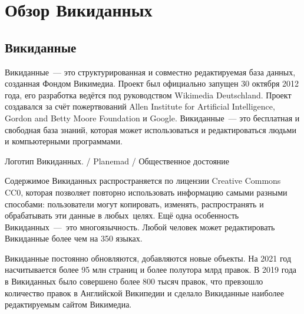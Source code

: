 \chapter{Обзор Викиданных}
\label{ch:ReviewAboutWD}

\section{Викиданные}

Викиданные~--- это структурированная и совместно редактируемая база данных, созданная Фондом Викимедиа\footnotemark.  Проект был официально запущен 30 октября 2012 года, его разработка ведётся под руководством Wikimedia Deutschland\footnotemark.  Проект создавался за счёт пожертвований Allen Institute for Artificial Intelligence, Gordon and Betty Moore Foundation и Google. Викиданные~--- это бесплатная и свободная база знаний, которая может использоваться и редактироваться людьми и компьютерными программами\autocite{Vrandecic}.\begin{marginfigure}[0.0cm]
{
	\setlength{\fboxsep}{0pt}%
	\setlength{\fboxrule}{1pt}%
}
\caption
{Логотип Викиданных.  / Planemad / Общественное достояние
}
\label{fig:seyu}
\end{marginfigure}

Содержимое Викиданных распространяется по лицензии Creative Commons CC0, которая позволяет повторно использовать информацию самыми разными способами: пользователи могут копировать, изменять, распространять и обрабатывать эти данные в любых целях. Ещё одна особенность Викиданных~--- это многоязычность. Любой человек может редактировать Викиданные более чем на 350 языках.

Викиданные постоянно обновляются, добавляются новые объекты. На 2021 год насчитывается более 95 млн страниц и более полутора млрд правок\footnotemark.  В 2019 года в Викиданных было совершено более 800 тысяч правок, что превзошло количество правок в Английской Википедии и сделало Викиданные наиболее редактируемым сайтом Викимедиа\footnotemark. 

